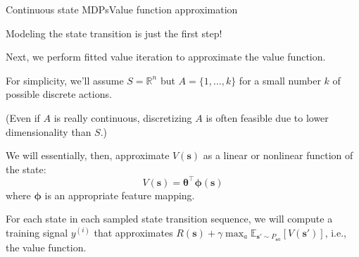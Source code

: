 \documentclass{beamer}
\renewcommand{\vec}[1]{\boldsymbol{#1}}
\def\Rset{\mathbb{R}}
\def\Expec{\mathbb{E}}
\begin{document}
\begin{frame}{Continuous state MDPs}{Value function approximation}

  Modeling the state transition is just the first step!

  \medskip

  Next, we perform \alert{fitted value iteration} to approximate the
  value function.

  \medskip

  For simplicity, we'll assume $S = \Rset^n$ but $A = \{ 1, \ldots, k \}$ for
  a small number $k$ of possible discrete actions.

  \medskip

  (Even if $A$ is really continuous, discretizing $A$ is often
  feasible due to lower dimensionality than $S$.)

  \medskip

  We will essentially, then, approximate $V(\vec{s})$ as a linear or
  nonlinear function of the state:
  \[ V(\vec{s}) = \vec{\theta}^\top\vec{\phi}(\vec{s}) \]
  where $\vec{\phi}$ is an appropriate feature mapping.

  \medskip

  For each state in each sampled state transition sequence, we will
  compute a training signal $y^{(i)}$ that approximates $R(\vec{s}) +
  \gamma \max_a\Expec_{\vec{s}'\sim P_{\vec{s}a}}[V(\vec{s}')]$, i.e.,
  the value function.
  
\end{frame}
\end{document}
